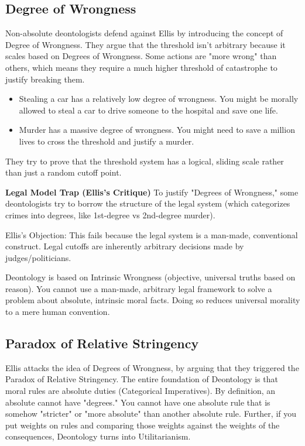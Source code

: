 \documentclass[12pt]{article}
\begin{document}
\subsection{Degree of Wrongness}
Non-absolute deontologists defend against Ellis by introducing the concept of Degree of Wrongness.
They argue that the threshold isn't arbitrary because it scales based on Degrees of Wrongness. Some actions are "more wrong" than others, which means they require a much higher threshold of catastrophe to justify breaking them.
\begin{itemize}
    \item Stealing a car has a relatively low degree of wrongness. You might be morally allowed to steal a car to drive someone to the hospital and save one life.
    \item Murder has a massive degree of wrongness. You might need to save a million lives to cross the threshold and justify a murder.
\end{itemize}
They try to prove that the threshold system has a logical, sliding scale rather than just a random cutoff point.

\vspace{1em}
\noindent\textbf{Legal Model Trap (Ellis's Critique)}
To justify "Degrees of Wrongness," some deontologists try to borrow the structure of the legal system (which categorizes crimes into degrees, like 1st-degree vs 2nd-degree murder).

\noindent Ellis's Objection: This fails because the legal system is a man-made, conventional construct. Legal cutoffs are inherently arbitrary decisions made by judges/politicians.

\noindent Deontology is based on Intrinsic Wrongness (objective, universal truths based on reason). You cannot use a man-made, arbitrary legal framework to solve a problem about absolute, intrinsic moral facts.
Doing so reduces universal morality to a mere human convention.

\subsection{Paradox of Relative Stringency}
Ellis attacks the idea of Degrees of Wrongness, by arguing that they triggered the Paradox of Relative Stringency.
The entire foundation of Deontology is that moral rules are absolute duties (Categorical Imperatives).
By definition, an absolute cannot have "degrees." You cannot have one absolute rule that is somehow "stricter" or "more absolute" than another absolute rule.
Further, if you put weights on rules and comparing those weights against the weights of the consequences, Deontology turns into Utilitarianism.
\end{document}
